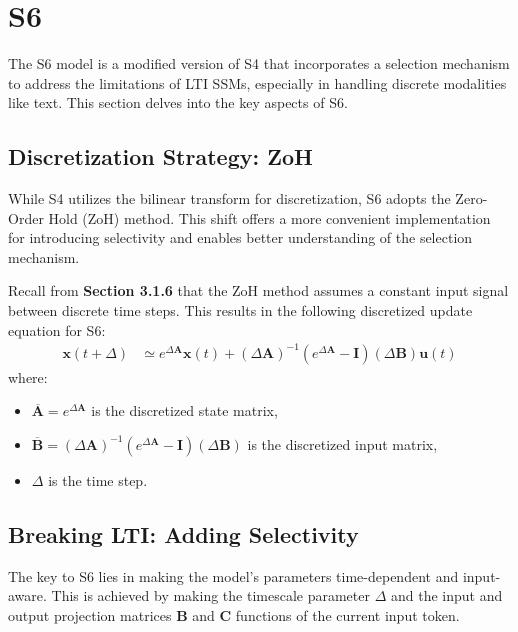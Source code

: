 \documentclass[12pt,a4paper]{report}
\begin{document}
\section{S6}

The S6 model \cite{mamba} is a modified version of S4 \cite{s4} that incorporates a selection mechanism to address the limitations of LTI SSMs, especially in handling discrete modalities like text. This section delves into the key aspects of S6.

\subsection{Discretization Strategy: ZoH}
While S4 utilizes the bilinear transform for discretization, S6 adopts the Zero-Order Hold (ZoH) method. This shift offers a more convenient implementation for introducing selectivity and enables better understanding of the selection mechanism.

Recall from \textbf{Section 3.1.6} that the ZoH method assumes a constant input signal between discrete time steps. This results in the following discretized update equation for S6:
\[
\begin{aligned}
\mathbf{x}(t+ \Delta) &\simeq e^{\Delta \mathbf{A}} \mathbf{x}(t) + (\Delta \mathbf{A})^{-1}(e^{\Delta \mathbf{A}} - \mathbf{I})(\Delta \mathbf{B}) \mathbf{u}(t)
\end{aligned}
\]
where:
\begin{itemize}
    \item $\mathbf{\overline{A}} = e^{\Delta \mathbf{A}}$ is the discretized state matrix,
    \item $\mathbf{\overline{B}} = (\Delta \mathbf{A})^{-1}(e^{\Delta \mathbf{A}} - \mathbf{I})(\Delta \mathbf{B})$ is the discretized input matrix,
    \item $\Delta$ is the time step.
\end{itemize}

\subsection{Breaking LTI: Adding Selectivity}
The key to S6 lies in making the model's parameters time-dependent and input-aware. This is achieved by making the timescale parameter $\Delta$ and the input and output projection matrices $\mathbf{B}$ and $\mathbf{C}$ functions of the current input token.

\medskip
\end{document}
